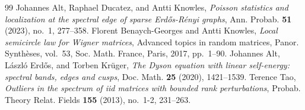 \documentclass[10pt,a4paper]{amsart}
\numberwithin{equation}{section}
\begin{document}
\begin{thebibliography}{99}
 Johannes Alt, Raphael Ducatez, and Antti Knowles, \emph{Poisson statistics and localization at the spectral edge of sparse {E}rd{\H o}s-{R}\'enyi graphs}, Ann. Probab. \textbf{51} (2023), no.~1, 277--358. 
 Florent Benaych-Georges and Antti Knowles, \emph{Local semicircle law for {W}igner matrices}, Advanced topics in random matrices, Panor. Synth\`eses, vol.~53, Soc. Math. France, Paris, 2017, pp.~1--90. 
 Johannes Alt, L\'aszl\'o{} Erd{\H o}s, and Torben Kr\"uger, \emph{The {D}yson equation with linear self-energy: spectral bands, edges and cusps}, Doc. Math. \textbf{25} (2020), 1421--1539. 
 Terence Tao, \emph{Outliers in the spectrum of iid matrices with bounded rank perturbations}, Probab. Theory Relat. Fields \textbf{155} (2013), no.~1-2, 231--263.
\end{thebibliography}
\end{document}
